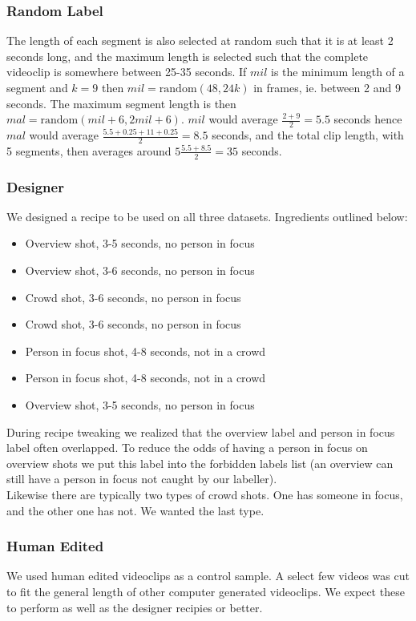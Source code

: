 \subsubsection{Random Label}
%
The length of each segment is also selected at random such that it is at least 2 seconds long, and the maximum length is selected such that the complete videoclip is somewhere between 25-35 seconds. If $mil$ is the minimum length of a segment and $k=9$ then $mil=\text{random}(48,24k)$ in frames, ie. between 2 and 9 seconds. The maximum segment length is then $mal=\text{random}(mil+6, 2mil+6)$. $mil$ would average $\frac{2+9}{2}=5.5$ seconds hence $mal$ would average $\frac{5.5+0.25+11+0.25}{2}=8.5$ seconds, and the total clip length, with 5 segments, then averages around $5\frac{5.5+8.5}{2}=35$ seconds.
%
\subsubsection{Designer}
%
We designed a recipe to be used on all three datasets. Ingredients outlined below:
\begin{itemize}
\item Overview shot, 3-5 seconds, no person in focus
\item Overview shot, 3-6 seconds, no person in focus
\item Crowd shot, 3-6 seconds, no person in focus
\item Crowd shot, 3-6 seconds, no person in focus
\item Person in focus shot, 4-8 seconds, not in a crowd
\item Person in focus shot, 4-8 seconds, not in a crowd
\item Overview shot, 3-5 seconds, no person in focus
\end{itemize}
%
During recipe tweaking we realized that the overview label and person in focus label often overlapped. To reduce the odds of having a person in focus on overview shots we put this label into the forbidden labels list (an overview can still have a person in focus not caught by our labeller).\\
Likewise there are typically two types of crowd shots. One has someone in focus, and the other one has not. We wanted the last type.
%
\subsubsection{Human Edited}
%
We used human edited videoclips as a control sample. A select few videos was cut to fit the general length of other computer generated videoclips. We expect these to perform as well as the designer recipies or better.
%
